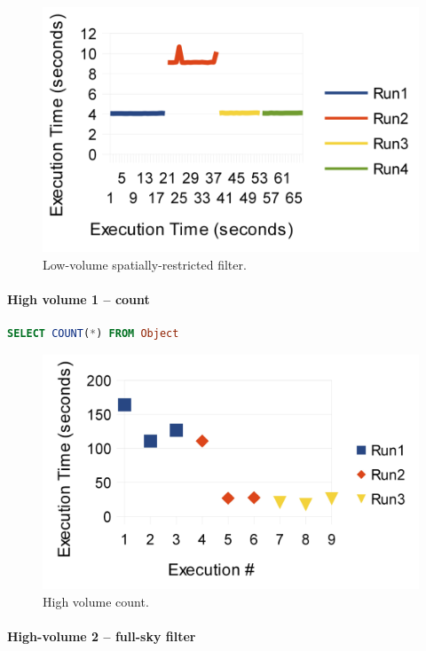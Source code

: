 \documentclass[DM,lsstdraft,toc]{lsstdoc}
\begin{document}
\begin{figure}[H]
\centering
\includegraphics{_static/low_volume_spatial_filter.png}
\caption{Low-volume spatially-restricted filter.}
\end{figure}

\paragraph{High volume 1 -- count}\label{high-volume-1-count}

\begin{lstlisting}[language=SQL]
SELECT COUNT(*) FROM Object
\end{lstlisting}

\begin{figure}[H]
\centering
\includegraphics{_static/150_node_high_volume_count.png}
\caption{High volume count.}
\end{figure}

\paragraph{High-volume 2 -- full-sky
filter}\label{high-volume-2-full-sky-filter}
\end{document}
